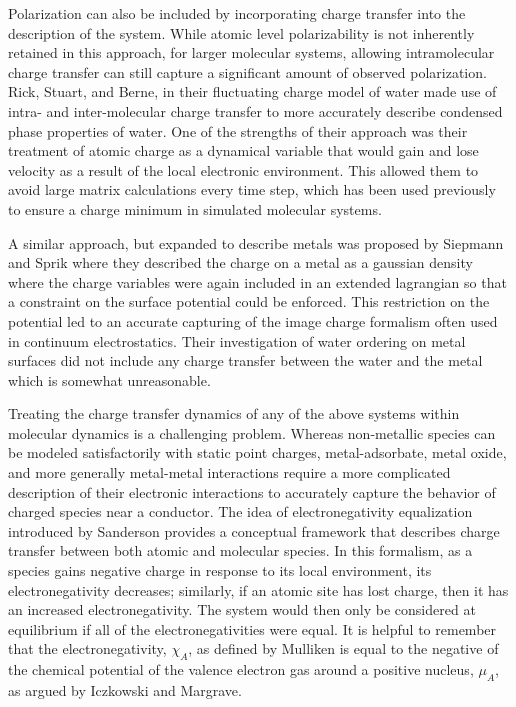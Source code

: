 Polarization can also be included by incorporating charge transfer into the
description of the system. While atomic level polarizability is not inherently
retained in this approach, for larger molecular systems, allowing
intramolecular charge transfer can still capture a significant amount of
observed polarization. Rick, Stuart, and Berne, in their fluctuating charge
model of water made use of intra- and inter-molecular charge transfer to more
accurately describe condensed phase properties of water.\citep{} One of the
strengths of their approach was their treatment of atomic charge as a dynamical
variable that would gain and lose velocity as a result of the local electronic
environment. This allowed them to avoid large matrix calculations every time
step, which has been used previously to ensure a charge minimum in simulated
molecular systems. 

A similar approach, but expanded to describe metals was proposed by Siepmann
and Sprik where they described the charge on a metal as a gaussian density
where the charge variables were again included in an extended lagrangian so
that a constraint on the surface potential could be enforced.\citep{} This
restriction on the potential led to an accurate capturing of the image charge
formalism often used in continuum electrostatics. Their investigation of water
ordering on metal surfaces did not include any charge transfer between the
water and the metal which is somewhat unreasonable. 

Treating the charge transfer dynamics of any of the above systems within molecular dynamics is a
challenging problem. Whereas non-metallic species can be modeled satisfactorily
with static point charges, metal-adsorbate, metal oxide, and more generally
metal-metal interactions require a more complicated description of their
electronic interactions to accurately capture the behavior of charged
species near a conductor. The idea of electronegativity equalization introduced
by Sanderson\citep{Sanderson:1951mz} provides a conceptual framework that
describes charge transfer between both atomic and molecular species. In this
formalism, as a species gains negative charge in response to its local
environment, its electronegativity decreases; similarly, if an atomic site has
lost charge, then it has an increased electronegativity. The system would then
only be considered at equilibrium if all of the electronegativities were equal.
It is helpful to remember that the electronegativity, $\chi_A$, as defined by
Mulliken\citep{Mulliken:1934wt} is equal to the negative of the chemical
potential of the valence electron gas around a positive nucleus, $\mu_A$, as
argued by Iczkowski and Margrave\citep{Iczkowski:1961wq}.

